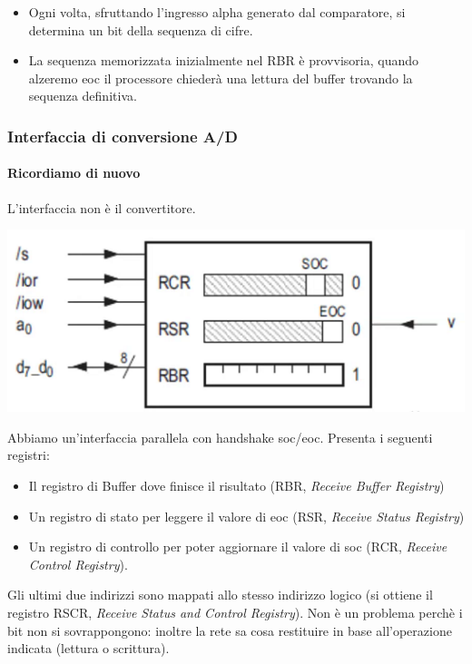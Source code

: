 \documentclass[11pt]{report}
\begin{document}
\begin{itemize}
\item Ogni volta, sfruttando l'ingresso alpha generato dal comparatore, si determina un bit della sequenza di cifre. 
\item La sequenza memorizzata inizialmente nel RBR è provvisoria, quando alzeremo eoc il processore chiederà una lettura del buffer trovando la sequenza definitiva.
\end{itemize}

\subsubsection{Interfaccia di conversione A/D}
\paragraph{Ricordiamo di nuovo} L'interfaccia non è il convertitore.
\begin{center}
\includegraphics{img/237.PNG}
\end{center}
Abbiamo un'interfaccia parallela con handshake soc/eoc. Presenta i seguenti registri:
\begin{itemize}
\item Il registro di Buffer dove finisce il risultato (RBR, \emph{Receive Buffer Registry})
\item Un registro di stato per leggere il valore di eoc (RSR, \emph{Receive Status Registry})
\item Un registro di controllo per poter aggiornare il valore di soc (RCR, \emph{Receive Control Registry}).
\end{itemize}
Gli ultimi due indirizzi sono mappati allo stesso indirizzo logico (si ottiene il registro RSCR, \emph{Receive Status and Control Registry}). Non è un problema perchè i bit non si sovrappongono: inoltre la rete sa cosa restituire in base all'operazione indicata (lettura o scrittura).
\end{document}
